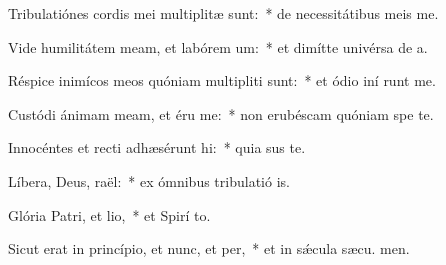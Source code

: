 \item Tribulatiónes cordis mei multiplitæ sunt:~* de necessitátibus meis  me.
\item Vide humilitátem meam, et labórem um:~* et dimítte univérsa de a.
\item Réspice inimícos meos quóniam multipliti sunt:~* et ódio iní runt me.
\item Custódi ánimam meam, et éru me:~* non erubéscam quóniam spe  te.
\item Innocéntes et recti adhæsérunt hi:~* quia sus te.
\item Líbera, Deus, raël:~* ex ómnibus tribulatió is.
\item Glória Patri, et lio,~* et Spirí to.
\item Sicut erat in princípio, et nunc, et per,~* et in sǽcula sæcu. men.
